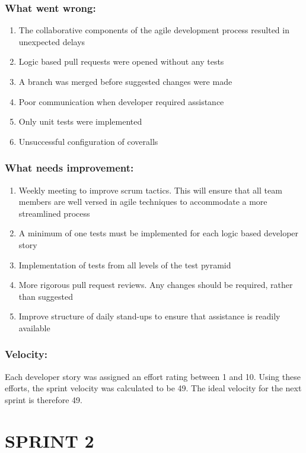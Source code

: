 \documentclass[10pt,onecolumn]{witseiepaper}
\begin{document}
\subsubsection*{What went wrong:}
\begin{enumerate}
	\item The collaborative components of the agile development process resulted in unexpected delays
	\item Logic based pull requests were opened without any tests
	\item A branch was merged before suggested changes were made
	\item Poor communication when developer required assistance
	\item Only unit tests were implemented 
	\item Unsuccessful configuration of coveralls
\end{enumerate}

\subsubsection*{What needs improvement:}
\begin{enumerate}
	\item Weekly meeting to improve scrum tactics. This will ensure that all team members are well versed in agile techniques to accommodate a more streamlined process
	\item A minimum of one tests must be implemented for each logic based developer story 
	\item Implementation of tests from all levels of the test pyramid
	\item More rigorous pull request reviews. Any changes should be required, rather than suggested
	\item Improve structure of daily stand-ups to ensure that assistance is readily available 
\end{enumerate}

\subsubsection*{Velocity:}
Each developer story was assigned an effort rating between 1 and 10. Using these efforts, the sprint velocity was calculated to be 49. The ideal velocity for the next sprint is therefore 49.

\section*{SPRINT 2}
\end{document}

